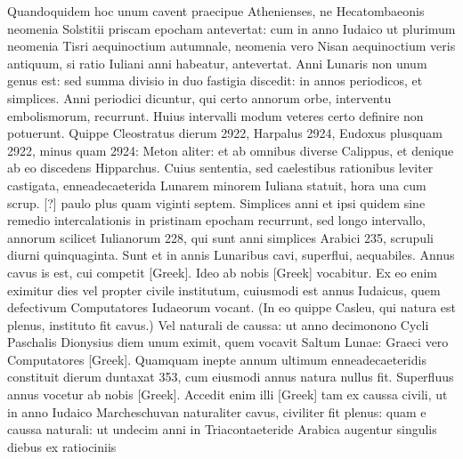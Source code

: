 Quandoquidem hoc unum cavent praecipue Athenienses,
 ne Hecatombaeonis
neomenia Solstitii priscam epocham antevertat: cum in
anno Iudaico ut plurimum neomenia Tisri aequinoctium autumnale,
neomenia vero Nisan aequinoctium veris antiquum, si ratio Iuliani
anni habeatur, antevertat.
Anni Lunaris non unum genus est: sed
summa divisio in duo fastigia discedit: in annos periodicos, et simplices.
Anni periodici dicuntur, qui certo annorum orbe, interventu
embolismorum, recurrunt.
Huius intervalli modum veteres certo
definire non potuerunt.
Quippe Cleostratus dierum 2922, Harpalus
2924, Eudoxus plusquam 2922, minus quam 2924: Meton aliter:
et ab omnibus diverse Calippus, et denique ab eo discedens Hipparchus.
Cuius sententia, sed caelestibus rationibus leviter castigata,
 enneadecaeterida
Lunarem minorem Iuliana statuit, hora una cum scrup. [?] paulo
plus quam viginti septem.
Simplices anni et ipsi quidem sine remedio
intercalationis in pristinam epocham recurrunt, sed longo intervallo,
annorum scilicet Iulianorum 228, qui sunt anni simplices Arabici 235,
scrupuli diurni quinquaginta.
Sunt et in annis Lunaribus cavi, superflui,
aequabiles.
Annus cavus is est, cui competit \textgreek{[Greek]}.
Ideo ab nobis \textgreek{[Greek]} vocabitur.
Ex eo enim eximitur dies
vel propter civile institutum, cuiusmodi est annus Iudaicus,
quem defectivum
Computatores Iudaeorum vocant.
(In eo quippe Casleu, qui natura est plenus, instituto fit cavus.)
Vel naturali de caussa: ut anno
decimonono Cycli Paschalis Dionysius diem unum eximit, quem
vocavit Saltum Lunae: Graeci vero Computatores
 \textgreek{[Greek]}.
Quamquam inepte annum ultimum enneadecaeteridis constituit dierum
duntaxat 353, cum eiusmodi annus natura nullus fit.
Superfluus
annus vocetur ab nobis \textgreek{[Greek]}.
Accedit enim illi \textgreek{[Greek]}
tam ex caussa civili, ut in anno Iudaico Marcheschuvan naturaliter
cavus, civiliter fit plenus: quam e caussa naturali: ut undecim anni
in Triacontaeteride Arabica augentur singulis diebus ex ratiociniis
